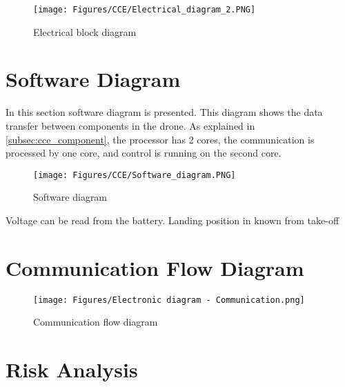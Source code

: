 \begin{figure}[H]
    \centering
    \texttt{[image: Figures/CCE/Electrical\_diagram\_2.PNG]}
    \caption{Electrical block diagram}
    \label{fig:Electrical_diagram}
\end{figure}

\section{Software Diagram} \label{sec:ccesoftwarediagram}
In this section software diagram is presented. This diagram shows the data transfer between components in the drone.  As explained in \autoref{subsec:cce_component}, the processor has 2 cores, the communication is processed by one core, and control is running on the second core. 

\begin{figure}[H]
    \centering
    \texttt{[image: Figures/CCE/Software\_diagram.PNG]}
    \caption{Software diagram}
    \label{fig:Software_diagram}
\end{figure}




Voltage can be read from the battery. 
Landing position in known from take-off


\section{Communication Flow Diagram} \label{sec:ccecommflowdiagram}

\begin{figure}[H]
    \centering
    \texttt{[image: Figures/Electronic diagram - Communication.png]}
    \caption{Communication flow diagram}
    \label{fig:commflowdiagram}
\end{figure}


\section{Risk Analysis }
\label{sec:cceriskanalysis}


